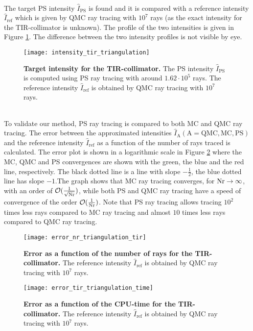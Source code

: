  \\ \indent 
The target PS intensity $\hat{I}_{\textrm{PS}}$ is found and it is compared with a reference intensity $\hat{I}_{\textrm{ref}}$ which is given by QMC ray tracing with $10^7$ rays (as the exact intensity for the TIR-collimator is unknown). The profile of the two intensities is given in Figure \ref{fig:intensity_tir_triangulation}. 
The difference between the two intensity profiles is not visible by eye.
 \begin{figure}[ht]
  \center
  \texttt{[image: intensity\_tir\_triangulation]}
  \caption{\textbf{Target intensity for the TIR-collimator.} The PS intensity $\hat{I}_{\textrm{PS}}$ is computed using PS ray tracing with around $1.62\cdot 10^5$ rays. The reference intensity $\hat{I}_{\textrm{ref}}$ is obtained by QMC ray tracing with $10^7$ rays.}
  \label{fig:intensity_tir_triangulation}
\end{figure}
\\ \indent
To validate our method, PS ray tracing is compared to both MC and QMC ray tracing. The error between the approximated intensities $\hat{I}_{\textrm{A}} (\textrm{A}=\textrm{QMC}, \textrm{MC}, \textrm{PS})$ and the reference intensity $\hat{I}_{\textrm{ref}}$ as a function of the number of rays traced is calculated. The error plot is shown in a logarithmic scale in Figure \ref{fig:error_tir_triangulation} where the MC, QMC and PS convergences are shown with the green, the blue and the red line, respectively. The black dotted line is a line with slope $-\frac{1}{2}$, the blue dotted line has slope $-1$.The graph shows that MC ray tracing converges, for $\textrm{Nr} \rightarrow \infty$, with an order of $\mathcal{O}(\frac{1}{\sqrt{\textrm{Nr}}})$, while both PS and QMC ray tracing have a speed of convergence of the order $\mathcal{O}(\frac{1}{\textrm{Nr}})$. 
Note that PS ray tracing allows tracing $10^2$ times less rays compared to MC ray tracing and almost $10$ times less rays compared to QMC ray tracing.
 \begin{figure}[h!]
  \center
  \texttt{[image: error\_nr\_triangulation\_tir]}
  \caption{\textbf{Error as a function of the number of rays for the TIR-collimator.} The reference intensity $\hat{I}_{\textrm{ref}}$ is obtained by QMC ray tracing with $10^7$ rays.}
  \label{fig:error_tir_triangulation}
\end{figure}
\begin{figure}[h!]
  \center
  \texttt{[image: error\_tir\_triangulation\_time]}
  \caption{\textbf{Error as a function of the CPU-time for the TIR-collimator.} The reference intensity $\hat{I}_{\textrm{ref}}$ is obtained by QMC ray tracing with $10^7$ rays.}
  \label{fig:error_tir_triangulation_time}
\end{figure}
